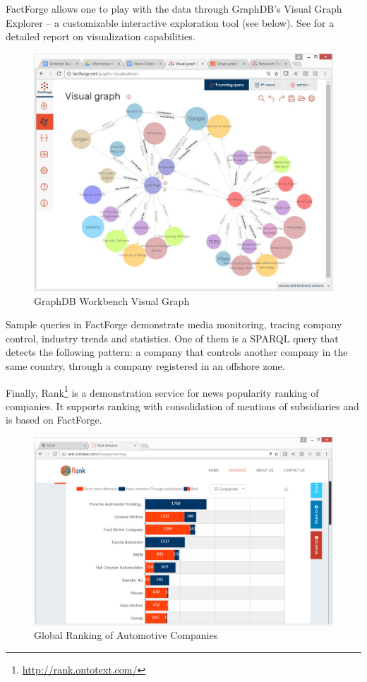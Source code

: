\documentclass[runningheads,a4paper]{llncs}
\makeatletter
\def\maxwidth#1{\ifdim\Gin@nat@width>#1 #1\else\Gin@nat@width\fi}
\makeatother
\begin{document}
FactForge allows one to play with the data through GraphDB's Visual Graph Explorer -- a customizable interactive exploration tool (see below). See  \cite{_Ref491439427} for a detailed report on visualization capabilities.
\begin{figure}[h!]
\centering
\includegraphics[width=\maxwidth{\textwidth}]{img/10000000000004C6000003CA6EE0A0766E99B97E.jpg}
\cprotect\caption{GraphDB Workbench Visual Graph}
\label{}
\end{figure}


Sample queries in FactForge demonstrate media monitoring, tracing company control, industry trends and statistics. One of them is a SPARQL query that detects the following pattern: a company that controls another company in the same country, through a company registered in an offshore zone.

Finally, Rank\footnote{\url{http://rank.ontotext.com/}} is a demonstration service for news popularity ranking of companies. It supports ranking with consolidation of mentions of subsidiaries and is based on FactForge.
\begin{figure}[h!]
\centering
\includegraphics[width=\maxwidth{\textwidth}]{img/100000000000059F00000389BBBF66F35F310098.png}
\cprotect\caption{Global Ranking of Automotive Companies}
\label{}
\end{figure}
\end{document}
